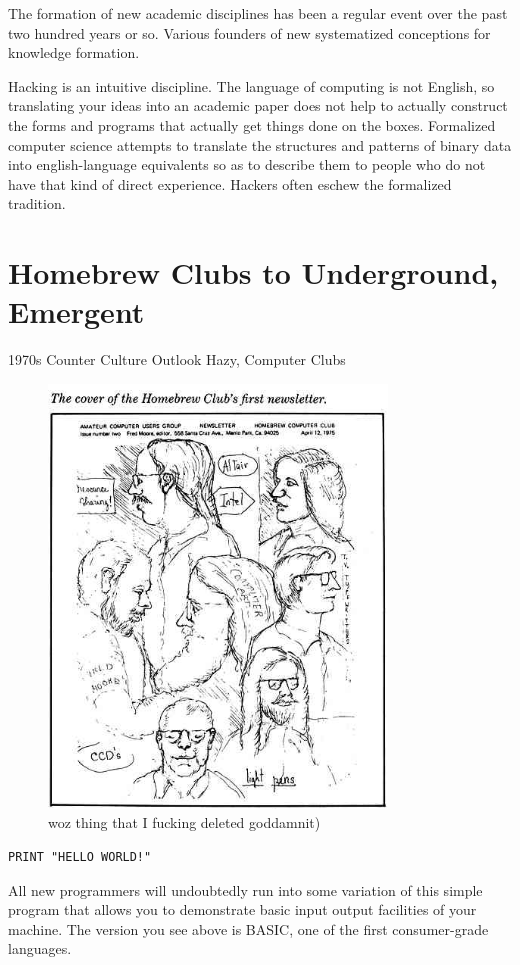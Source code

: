 \documentclass[11pt]{article}
\begin{document}
The formation of new academic disciplines has been a regular event over the past two hundred years or so. Various founders of new systematized conceptions for knowledge formation.

Hacking is an intuitive discipline. The language of computing is not English, so translating your ideas into an academic paper does not help to actually construct the forms and programs that actually get things done on the boxes. Formalized computer science attempts to translate the structures and patterns of binary data into english-language equivalents so as to describe them to people who do not have that kind of direct experience. Hackers often eschew the formalized tradition.
\section{Homebrew Clubs to Underground, Emergent}

1970s Counter Culture Outlook Hazy, Computer Clubs

\begin{figure}[ht!]
\center
\includegraphics[width=90mm]{homebrew_cover.jpg}
\caption{woz thing that I fucking deleted goddamnit)}
\end{figure}

\begin{verbatim}
PRINT "HELLO WORLD!"
\end{verbatim}
All new programmers will undoubtedly run into some variation of this simple program that allows you to demonstrate basic input output facilities of your machine. The version you see above is BASIC, one of the first consumer-grade languages.
\end{document}
